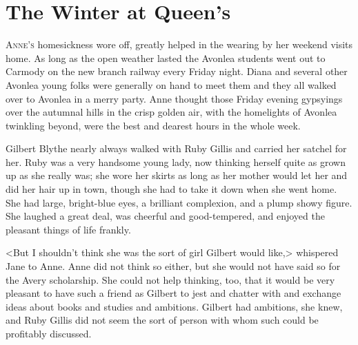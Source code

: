 \chapter{The Winter at Queen's}

\lettrine[]{A}{nne's} homesickness wore off, greatly helped in the wearing by her weekend visits home. As long as the open weather lasted the Avonlea students went out to Carmody on the new branch railway every Friday night. Diana and several other Avonlea young folks were generally on hand to meet them and they all walked over to Avonlea in a merry party. Anne thought those Friday evening gypsyings over the autumnal hills in the crisp golden air, with the homelights of Avonlea twinkling beyond, were the best and dearest hours in the whole week.

Gilbert Blythe nearly always walked with Ruby Gillis and carried her satchel for her. Ruby was a very handsome young lady, now thinking herself quite as grown up as she really was; she wore her skirts as long as her mother would let her and did her hair up in town, though she had to take it down when she went home. She had large, bright-blue eyes, a brilliant complexion, and a plump showy figure. She laughed a great deal, was cheerful and good-tempered, and enjoyed the pleasant things of life frankly.

<But I shouldn't think she was the sort of girl Gilbert would like,> whispered Jane to Anne. Anne did not think so either, but she would not have said so for the Avery scholarship. She could not help thinking, too, that it would be very pleasant to have such a friend as Gilbert to jest and chatter with and exchange ideas about books and studies and ambitions. Gilbert had ambitions, she knew, and Ruby Gillis did not seem the sort of person with whom such could be profitably discussed.

